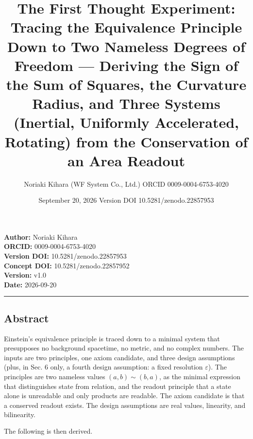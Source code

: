 \documentclass[
  a4paper,
]{article}
\title{The First Thought Experiment: Tracing the Equivalence Principle
Down to Two Nameless Degrees of Freedom --- Deriving the Sign of the Sum
of Squares, the Curvature Radius, and Three Systems (Inertial, Uniformly
Accelerated, Rotating) from the Conservation of an Area Readout}
\author{Noriaki Kihara (WF System Co., Ltd.) ORCID 0009-0004-6753-4020}
\date{September 20, 2026 Version DOI 10.5281/zenodo.22857953}
\begin{document}
\maketitle

\textbf{Author:} Noriaki Kihara\\
\textbf{ORCID:} 0009-0004-6753-4020\\
\textbf{Version DOI:} 10.5281/zenodo.22857953\\
\textbf{Concept DOI:} 10.5281/zenodo.22857952\\
\textbf{Version:} v1.0\\
\textbf{Date:} 2026-09-20

\begin{center}\rule{0.5\linewidth}{0.5pt}\end{center}

\subsection{Abstract}\label{abstract}

Einstein's equivalence principle is traced down to a minimal system that
presupposes no background spacetime, no metric, and no complex numbers.
The inputs are two principles, one axiom candidate, and three design
assumptions (plus, in Sec. 6 only, a fourth design assumption: a fixed
resolution \(\varepsilon\)). The principles are two nameless values
\((a,b)\sim(b,a)\), as the minimal expression that distinguishes state
from relation, and the readout principle that a state alone is
unreadable and only products are readable. The axiom candidate is that a
conserved readout exists. The design assumptions are real values,
linearity, and bilinearity.

The following is then derived.
\end{document}
